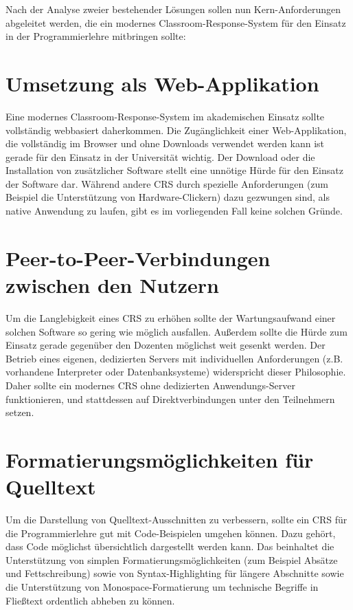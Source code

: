 Nach der Analyse zweier bestehender Lösungen sollen nun Kern-Anforderungen abgeleitet werden, die ein modernes Classroom-Response-System für den Einsatz in der Programmierlehre mitbringen sollte:

\section{Umsetzung als Web-Applikation}
\label{chap:webbasiert}
Eine modernes Classroom-Response-System im akademischen Einsatz sollte vollständig webbasiert daherkommen. Die Zugänglichkeit einer Web-Applikation, die vollständig im Browser und ohne Downloads verwendet werden kann ist gerade für den Einsatz in der Universität wichtig. Der Download oder die Installation von zusätzlicher Software stellt eine unnötige Hürde für den Einsatz der Software dar. Während andere CRS durch spezielle Anforderungen (zum Beispiel die Unterstützung von Hardware-Clickern) dazu gezwungen sind, als native Anwendung zu laufen, gibt es im vorliegenden Fall keine solchen Gründe.

\section{Peer-to-Peer-Verbindungen zwischen den Nutzern}
\label{chap:anforderung_p2p}
Um die Langlebigkeit eines CRS zu erhöhen sollte der Wartungsaufwand einer solchen Software so gering wie möglich ausfallen. Außerdem sollte die Hürde zum Einsatz  gerade gegenüber den Dozenten möglichst weit gesenkt werden. Der Betrieb eines eigenen, dedizierten Servers mit individuellen Anforderungen (z.B. vorhandene Interpreter oder Datenbanksysteme) widerspricht dieser Philosophie. Daher sollte ein modernes CRS ohne dedizierten Anwendungs-Server funktionieren, und stattdessen auf Direktverbindungen unter den Teilnehmern setzen.

\section{Formatierungsmöglichkeiten für Quelltext}
\label{chap:codeformatierung}
Um die Darstellung von Quelltext-Ausschnitten zu verbessern, sollte ein CRS für die Programmierlehre gut mit Code-Beispielen umgehen können. Dazu gehört, dass Code möglichst übersichtlich dargestellt werden kann. Das beinhaltet die Unterstützung von simplen Formatierungsmöglichkeiten (zum Beispiel Absätze und Fettschreibung) sowie von Syntax-Highlighting für längere Abschnitte sowie die Unterstützung von Monospace-Formatierung um technische Begriffe in Fließtext ordentlich abheben zu können.

